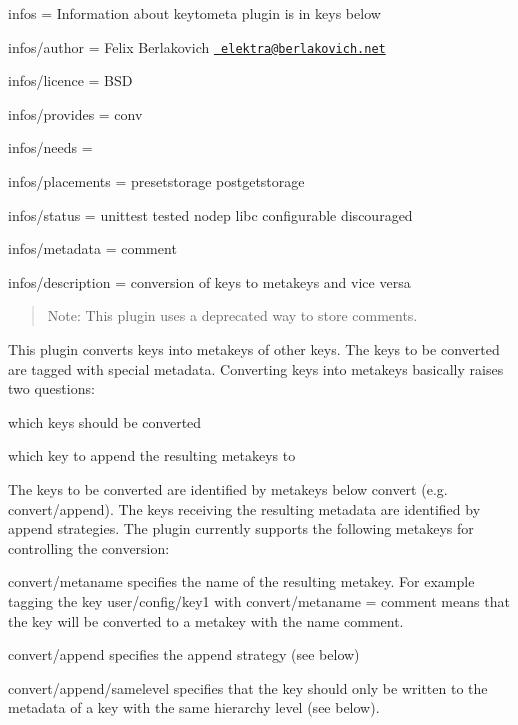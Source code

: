 
\begin{DoxyItemize}
\item infos = Information about keytometa plugin is in keys below
\item infos/author = Felix Berlakovich \href{mailto:elektra@berlakovich.net}{\texttt{ elektra@berlakovich.\+net}}
\item infos/licence = B\+SD
\item infos/provides = conv
\item infos/needs =
\item infos/placements = presetstorage postgetstorage
\item infos/status = unittest tested nodep libc configurable discouraged
\item infos/metadata = comment
\item infos/description = conversion of keys to metakeys and vice versa
\end{DoxyItemize}

\begin{quote}
Note\+: This plugin uses a deprecated way to store comments. \end{quote}


This plugin converts keys into metakeys of other keys. The keys to be converted are tagged with special metadata. Converting keys into metakeys basically raises two questions\+:


\begin{DoxyItemize}
\item which keys should be converted
\item which key to append the resulting metakeys to
\end{DoxyItemize}

The keys to be converted are identified by metakeys below {\ttfamily convert} (e.\+g. {\ttfamily convert/append}). The keys receiving the resulting metadata are identified by append strategies. The plugin currently supports the following metakeys for controlling the conversion\+:


\begin{DoxyItemize}
\item {\ttfamily convert/metaname} specifies the name of the resulting metakey. For example tagging the key {\ttfamily user/config/key1} with {\ttfamily convert/metaname = comment} means that the key will be converted to a metakey with the name {\ttfamily comment}.
\item {\ttfamily convert/append} specifies the append strategy (see below)
\item {\ttfamily convert/append/samelevel} specifies that the key should only be written to the metadata of a key with the same hierarchy level (see below).
\end{DoxyItemize}


